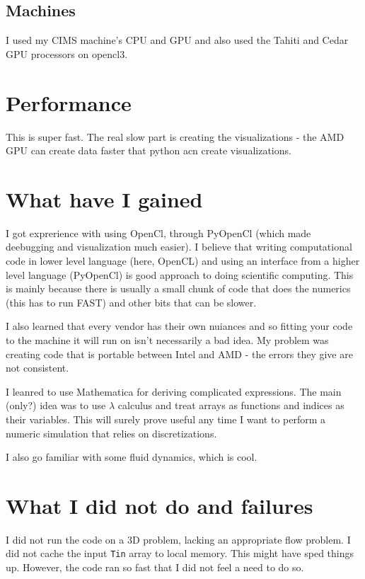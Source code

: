 \documentclass[paper=a4, fontsize=11pt]{scrartcl} %
\numberwithin{equation}{section} %
\numberwithin{figure}{section} %
\numberwithin{table}{section} %
\newcommand{\coder}[1]{\texttt{#1}}
\begin{document}
\subsection{Machines}
I used my CIMS machine's CPU and GPU and also used the Tahiti and Cedar GPU processors on opencl3.



\section{Performance}
This is super fast. The real slow part is creating the 
visualizations - the AMD GPU can create data faster that python acn create visualizations.



\section{What have I gained}
I got exprerience with using OpenCl, through PyOpenCl (which made deebugging and visualization much easier). I believe that writing 
computational code in lower level language (here, OpenCL) and using an interface from a higher level language (PyOpenCl) is good
approach to doing scientific computing. This is mainly because there is usually a small chunk of code that does the numerics (this has to 
run FAST) and other bits that can be slower.

I also learned that every vendor has their own nuiances and so fitting your code to the machine it will run on isn't necessarily
a bad idea. My problem was creating code that is portable between Intel and AMD - the errors they give are not consistent.

I leanred to use Mathematica for deriving complicated expressions. The main (only?) idea was to use $\lambda$ calculus
and treat arrays as functions and indices as their variables. This will surely prove useful any time I want to perform a numeric
simulation that relies on discretizations.

I also go familiar with some fluid dynamics, which is cool.

\section{What I did not do and failures}
I did not run the code on a 3D problem, lacking an appropriate flow problem. I did not cache the input \coder{Tin} array to local memory.
This might have sped things up. However, the code ran so fast that I did not feel a need to do so.
\end{document}
